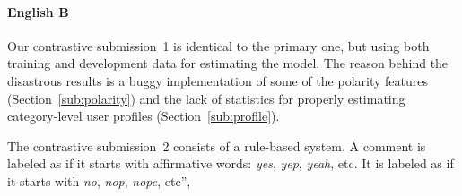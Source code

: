 \paragraph{English B}

Our contrastive submission~1 is identical to the primary one, but using both 
training and development data for estimating the model. The reason behind the 
disastrous results is a buggy implementation of some of the polarity features 
(\cf Section~\ref{sub:polarity}) and the lack of statistics for properly 
estimating category-level user profiles (\cf Section~\ref{sub:profile}). 
 
 
The contrastive submission~2 consists of a rule-based system. A comment is 
labeled as \yes if it starts with affirmative words: \textit{yes}, \textit{yep}, 
\textit{yeah}, etc.
It is labeled as \no if it starts with \textit{no}, \textit{nop}, \textit{nope}, 
etc”, 

